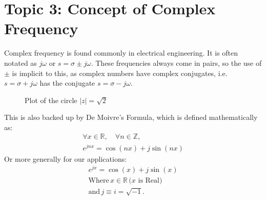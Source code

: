 \documentclass[../notes-main.tex]{subfiles}
\begin{document}
\section{Topic 3: Concept of Complex Frequency}
Complex frequency is found commonly in electrical engineering. It is often notated as \( j\omega \) or \( s = \sigma \pm j \omega \). These frequencies always come in pairs, so the use of \( \pm \) is implicit to this, as complex numbers have complex conjugates, i.e.
\(s = \sigma + j \omega \) has the conjugate \(s = \sigma - j\omega \).

\begin{figure}[H]
    \centering
    \caption{Plot of the circle \(|z| = \sqrt{2}\)}\label{fig:pgfplots-complex-plane-1}
\end{figure}
\vspace{-1em}
\noindent This is also backed up by De Moivre's Formula, which is defined mathematically as:
\begin{gather*}
    \forall x \in \mathbb{R}, \quad \forall n \in \mathbb{Z}, \\
    e^{j n x} = \cos(n x) + j \sin(n x)
\end{gather*}
Or more generally for our applications:
\begin{gather*}
    e^{jx} = \cos(x) + j\sin(x) \\
    \text{Where} \, x \in \mathbb{R}\, \text{(\(x\) is Real)} \\
    \text{and} \, j \equiv i = \sqrt{-1}.
\end{gather*}
\end{document}
